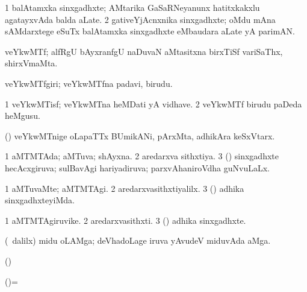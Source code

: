{{{{{{{{{{\noindent 
\gl{\pagu}
\expl{}
\bmng
\bnum
\num{1}  balAtamxka sinxgadhxte; AMtarika GaSaRNeyanunx hatitxkakxlu agatayxvAda balda aLate. 
\num{2} gativeYjAcnxnika sinxgadhxte; oMdu mAna sAMdarxtege eSuTx balAtamxka sinxgadhxte eMbaudara aLate yA parimAN. 
\enum
\emng
\eentry

\bentry 
{} 
\gl{\nA}
\expl{}
\bmng
 veYkwMTf; alfRgU bAyxranfgU naDuvaN aMtasitxna birxTiSf variSaThx, shirxVmaMta. 
\emng
\eentry

\bentry 
{} 
\gl{\nA}
\bmng
 veYkwMTfgiri; veYkwMTfna padavi, birudu. 
\emng
\eentry

\bentry
{} 
\gl{\nA}
\expl{}
\bmng
\bnum
\num{1} veYkwMTisf; veYkwMTna heMDati yA vidhave. 
\num{2} veYkwMTf birudu paDeda heMgusu. 
\enum
\emng
\eentry

\bentry 
{} 
\gl{\nA}
\expl{}
\bmng
\emng
\eentry

\bentry
{} 
\gl{\nA}
\bmng
 (\ca) veYkwMTnige oLapaTTx BUmikANi, pArxMta, adhikAra keSxVtarx. 
\emng
\eentry

\bentry
{} 
\gl{\gu}
\expl{}
\bmng
\bnum
\num{1} aMTMTAda; aMTuva; shAyxna. 
\num{2} aredarxva sithxtiya. 
\num{3} (\Bwvi) sinxgadhxte hecAcxgiruva; sulBavAgi hariyadiruva; parxvAhaniroVdha guNvuLaLx. 
\enum
\emng
\eentry

\bentry
{} 
\gl{\kirxvi}
\expl{}
\bmng
\bnum
\num{1} aMTuvaMte; aMTMTAgi. 
\num{2} aredarxvasithxtiyalilx. 
\num{3} (\Bwvi) adhika sinxgadhxteyiMda. 
\enum
\emng
\eentry

\bentry
{} 
\gl{\nA}
\expl{}
\bmng
\bnum
\num{1} aMTMTAgiruvike. 
\num{2} aredarxvasithxti. 
\num{3} (\Bwvi) adhika sinxgadhxte. 
\enum
\emng
\eentry

\bentry
{} 
\gl{\nA}
\bmng
 (\sA\ \bava dalilx) midu oLAMga; deVhadoLage iruva yAvudeV miduvAda aMga. 
\emng
\eentry

\bentry 
{} 
\gl{\nA}
\expl{}
\bmng
 (\ame)  
\emng
\eentry

\bentry
{} 
\gl{\sakirx}
\expl{}
\bmng
 (\ame)=  
\emng
\eentry

}}}}}}}}}}
